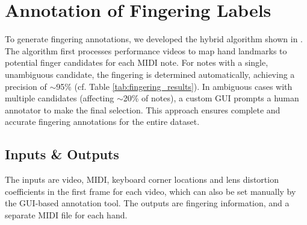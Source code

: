 \documentclass{article}
\begin{document}

\section{Annotation of Fingering Labels}\label{sec:fingering_detection}
To generate fingering annotations, we developed the hybrid algorithm shown in . The algorithm first processes performance videos to map hand landmarks to potential finger candidates for each MIDI note. For notes with a single, unambiguous candidate, the fingering is determined automatically, achieving a precision of $\sim$95\% (cf. Table \ref{tab:fingering_results}). In ambiguous cases with multiple candidates (affecting $\sim$20\% of notes), a custom GUI prompts a human annotator to make the final selection. This approach ensures complete and accurate fingering annotations for the entire dataset.


\subsection{Inputs \& Outputs}
The inputs are video, MIDI, keyboard corner locations and lens distortion coefficients in the first frame for each video, which can also be set manually by the GUI-based annotation tool.
The outputs are fingering information, and a separate MIDI file for each hand.
\end{document}
